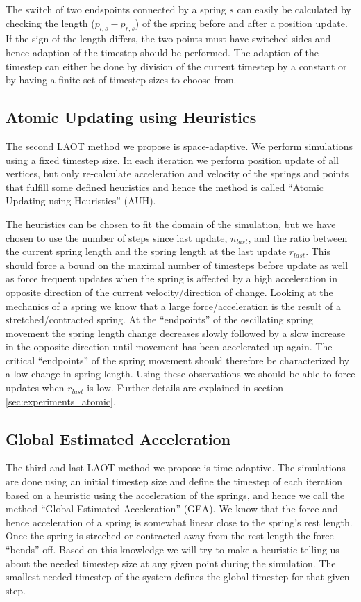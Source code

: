 \documentclass[11pt]{article}
\begin{document}
The switch of two endspoints connected by a spring $s$ can easily be
calculated by checking the length ($p_{l,s} - p_{r,s}$) of the spring before
and after a position update. If the sign of the length differs, the two
points must have switched sides and hence adaption of the timestep should be
performed. The adaption of the timestep can either be done by division of the
current timestep by a constant or by having a finite set of timestep sizes to
choose from.

\subsection{Atomic Updating using Heuristics}
The second LAOT method we propose is space-adaptive. We perform simulations
using a fixed timestep size. In each iteration we perform position update of
all vertices, but only re-calculate acceleration and velocity of the springs
and points that fulfill some defined heuristics and hence the method is called
``Atomic Updating using Heuristics'' (AUH).

The heuristics can be chosen to fit the domain of the simulation, but we
have chosen to use the number of steps since last update, $n_{last}$, and
the ratio between the current spring length and the spring length at the
last update $r_{last}$. This should force a bound on the maximal number of
timesteps before update as well as force frequent updates when the spring
is affected by a high acceleration in opposite direction of the current
velocity/direction of change. Looking at the mechanics of a spring we know
that a large force/acceleration is the result of a stretched/contracted
spring. At the ``endpoints'' of the oscillating spring movement the spring
length change decreases slowly followed by a slow increase in the opposite
direction until movement has been accelerated up again. The critical
``endpoints'' of the spring movement should therefore be characterized by a
low change in spring length. Using these observations we should be able to
force updates when $r_{last}$ is low. Further details are explained in section
\ref{sec:experiments_atomic}.

\subsection{Global Estimated Acceleration}
The third and last LAOT method we propose is time-adaptive. The simulations
are done using an initial timestep size and define the timestep of each
iteration based on a heuristic using the acceleration of the springs, and
hence we call the method ``Global Estimated Acceleration'' (GEA). We know
that the force and hence acceleration of a spring is somewhat linear close to
the spring's rest length. Once the spring is streched or contracted away from
the rest length the force ``bends'' off.
Based on this knowledge we will try to make a heuristic telling us about the
needed timestep size at any given point during the simulation. The smallest
needed timestep of the system defines the global timestep for that given step.
\end{document}
